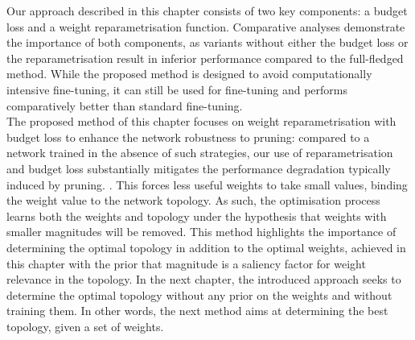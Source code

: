 Our approach described in this chapter consists of two key components: a budget
loss and a weight reparametrisation function. Comparative analyses demonstrate
the importance of both components, as variants without either the budget loss
or the reparametrisation result in inferior performance compared to the
full-fledged method. While the proposed method is designed to avoid
computationally intensive fine-tuning, it can still be used for fine-tuning and
performs comparatively better than standard fine-tuning.\\

The proposed method of this chapter focuses on weight reparametrisation with
budget loss to enhance the network robustness to pruning: compared to a network
trained in the absence of such strategies, our use of reparametrisation and
budget loss substantially mitigates the performance degradation typically
induced by pruning. . This forces less useful weights to take small values,
binding the weight value to the network topology. As such, the optimisation
process learns both the weights and topology under the hypothesis that weights
with smaller magnitudes will be removed. This method highlights the importance
of determining the optimal topology in addition to the optimal weights, achieved
in this chapter with the prior that magnitude is a saliency factor for weight
relevance in the topology. In the next chapter, the introduced approach seeks to
determine the optimal topology without any prior on the weights and without
training them. In other words, the next method aims at determining the best
topology, given a set of weights.

